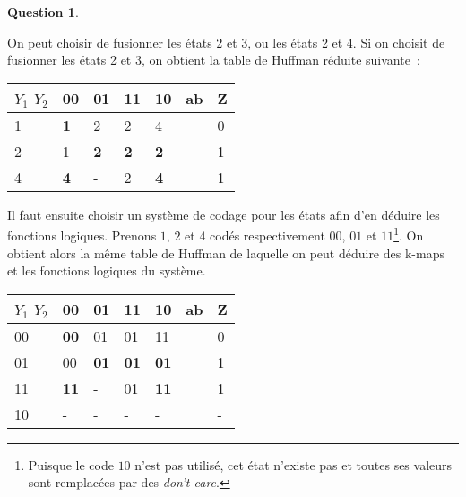 \documentclass[11pt,a4paper]{article}
\theoremstyle{definition}%
\newtheorem{Q}{Question}[] %
\begin{document}
\begin{Q}
{\begin{enumerate}
		On peut choisir de fusionner les états 2 et 3, ou les états 2 et 4.
		Si on choisit de fusionner les états 2 et 3, on obtient la table de Huffman réduite suivante~:
		\begin{center}
			\begin{tabular}{|l|l|l|l|l|l|l|}
			\hline
			$Y_1$ $Y_2$ & 00         & 01         & 11         & 10         & ab & Z \\ \hline
			1           & \textbf{1} & 2          & 2          & 4          &    & 0 \\ \cline{1-5} \cline{7-7}
			2           & 1          & \textbf{2} & \textbf{2} & \textbf{2} &    & 1 \\ \cline{1-5} \cline{7-7}
			4           & \textbf{4} & -          & 2          & \textbf{4} &    & 1 \\ \cline{1-5} \cline{7-7}
			\end{tabular}
		\end{center}

		Il faut ensuite choisir un système de codage pour les états afin d'en déduire les fonctions logiques.
		Prenons $1$, $2$ et $4$ codés respectivement $00$, $01$ et $11$\footnote{Puisque le code $10$ n'est pas utilisé, cet état n'existe pas et toutes ses valeurs sont remplacées par des \textit{don't care}.}.
		On obtient alors la même table de Huffman de laquelle on peut déduire des k-maps et les fonctions logiques du système.

		\begin{center}
			\begin{tabular}{|l|l|l|l|l|l|l|}
			\hline
			$Y_1$ $Y_2$ & 00         & 01         & 11         & 10         & ab & Z \\ \hline
			00           & \textbf{00} & 01          & 01          & 11          &    & 0 \\ \cline{1-5} \cline{7-7}
			01           & 00          & \textbf{01} & \textbf{01} & \textbf{01} &    & 1 \\ \cline{1-5} \cline{7-7}
			11           & \textbf{11} & -          & 01          & \textbf{11} &    & 1 \\ \cline{1-5} \cline{7-7}
			10           & -           & -          & -           & -           &    & - \\ \cline{1-5} \cline{7-7}
			\end{tabular}



\end{center}
\end{enumerate}}
\end{Q}
\end{document}
